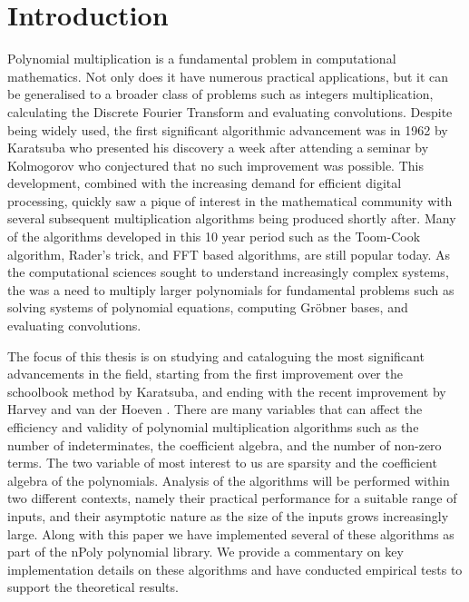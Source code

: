 \chapter{Introduction}\label{introduction}


Polynomial multiplication is a fundamental problem in computational mathematics. Not only does it have numerous practical applications, but it can be generalised to a broader class of problems such as integers multiplication, calculating the Discrete Fourier Transform and evaluating convolutions. Despite being widely used, the first significant algorithmic advancement was in 1962 by Karatsuba \cite{karatsuba} who presented his discovery a week after attending a seminar by Kolmogorov who conjectured that no such improvement was possible. This development, combined with the increasing demand for efficient digital processing, quickly saw a pique of interest in the mathematical community with several subsequent multiplication algorithms being produced shortly after. Many of the algorithms developed in this 10 year period such as the Toom-Cook algorithm, Rader's trick, and FFT based algorithms, are still popular today. As the computational sciences sought to understand increasingly complex systems, the was a need to multiply larger polynomials for fundamental problems such as solving systems of polynomial equations, computing Gr\"{o}bner bases, and evaluating convolutions.

\medskip

The focus of this thesis is on studying and cataloguing the most significant advancements in the field, starting from the first improvement over the schoolbook method by Karatsuba, and ending with the recent improvement by Harvey and van der Hoeven \cite{nlogn}. There are many variables that can affect the efficiency and validity of polynomial multiplication algorithms such as the number of indeterminates, the coefficient algebra, and the number of non-zero terms. The two variable of most interest to us are sparsity and the coefficient algebra of the polynomials. Analysis of the algorithms will be performed within two different contexts, namely their practical performance for a suitable range of inputs, and their asymptotic nature as the size of the inputs grows increasingly large. Along with this paper we have implemented several of these algorithms as part of the nPoly polynomial library. We provide a commentary on key implementation details on these algorithms and have conducted empirical tests to support the theoretical results.

